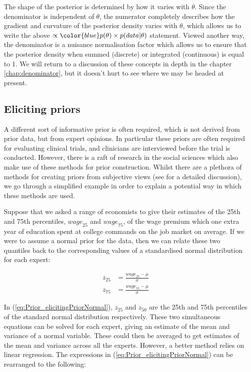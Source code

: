 \documentclass[11pt,fullpage]{book}
\begin{document}
The shape of the posterior is determined by how it varies with $\theta$. Since the denominator is independent of $\theta$, the numerator completely describes how the gradient and curvature of the posterior density varies with $\theta$, which allows us to write the above  $ \propto {\color{blue}p(\theta)\times p(data|\theta)}$ statement. Viewed another way, the denominator is a nuisance normalisation factor which allows us to ensure that the posterior density when summed (discrete) or integrated (continuous) is equal to 1. We will return to a discussion of these concepts in depth in the chapter \ref{chap:denominator}, but it doesn't hurt to see where we may be headed at present.


\subsection{Eliciting priors}
A different sort of informative prior is often required, which is not derived from prior data, but from expert opinions. In particular these priors are often required for evaluating clinical trials, and clinicians are interviewed before the trial is conducted. However, there is a raft of research in the social sciences which also make use of these methods for prior construction. Whilst there are a plethora of methods for creating priors from subjective views (see \cite{gill2007bayesian} for a detailed discussion), we go through a simplified example in order to explain a potential way in which these methods are used. 

Suppose that we asked a range of economists to give their estimates of the 25th and 75th percentiles, ${wage}_{25}$ and ${wage}_{75}$, of the wage premium which one extra year of education spent at college commands on the job market on average. If we were to assume a normal prior for the data, then we can relate these two quantiles back to the corresponding values of a standardised normal distribution for each expert:


\begin{align}\label{eq:Prior_elicitingPriorNormal}
z_{25} &= \frac{{wage}_{25} - \mu}{\sigma}\\
z_{75} &= \frac{{wage}_{75} - \mu}{\sigma}
\end{align}

In (\ref{eq:Prior_elicitingPriorNormal}), $z_{25}$ and $z_{50}$ are the 25th and 75th percentiles of the standard normal distribution respectively. These two simultaneous equations can be solved for each expert, giving an estimate of the mean and variance of a normal variable. These could then be averaged to get estimates of the mean and variance across all the experts. However, a better method relies on linear regression. The expressions in (\ref{eq:Prior_elicitingPriorNormal}) can be rearranged to the following:
\end{document}
